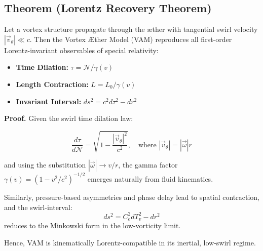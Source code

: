\documentclass[preprint]{revtex4-2}
\begin{document}

    \subsection{Theorem (Lorentz Recovery Theorem)}

    \begin{theorem*}
        Let a vortex structure propagate through the æther with tangential swirl velocity \( |\vec{v}_\theta| \ll c \). Then the Vortex Æther Model (VAM) reproduces all first-order Lorentz-invariant observables of special relativity:

        \begin{itemize}
            \item \textbf{Time Dilation:} \( \tau = \mathcal{N} / \gamma(v) \)
            \item \textbf{Length Contraction:} \( L = L_0 / \gamma(v) \)
            \item \textbf{Invariant Interval:} \( ds^2 = c^2 d\tau^2 - dr^2 \)
        \end{itemize}

        \textbf{Proof.}
        Given the swirl time dilation law:\\

        \begin{eqbox}
            \begin{equation}\label{eq:swirl-dilation}
            \frac{d\tau}{d\mathcal{N}} = \sqrt{1 - \frac{|\vec{v}_\theta|^2}{c^2}}, \quad \text{where } |\vec{v}_\theta| = |\vec{\omega}| r
            \end{equation}
        \end{eqbox}


        and using the substitution \( |\vec{\omega}| \to v/r \), the gamma factor \( \gamma(v) = \left(1 - v^2/c^2\right)^{-1/2} \) emerges naturally from fluid kinematics.

        Similarly, pressure-based asymmetries and phase delay lead to spatial contraction, and the swirl-interval:
        \[
            ds^2 = C_e^2 dT_v^2 - dr^2
        \]
        reduces to the Minkowski form in the low-vorticity limit.

        Hence, VAM is kinematically Lorentz-compatible in its inertial, low-swirl regime.
    \end{theorem*}

\end{document}
